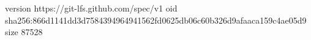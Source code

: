 version https://git-lfs.github.com/spec/v1
oid sha256:866d1141dd3d7584394964941562fd0625db06c60b326d9afaaca159c4ae05d9
size 87528
